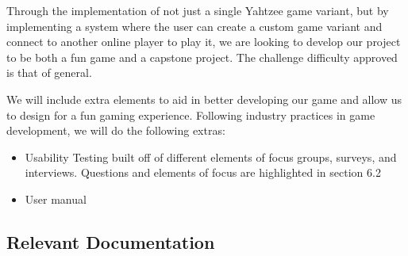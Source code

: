 \documentclass[12pt, titlepage]{article}
\begin{document}
\fi

Through the implementation of not just a single Yahtzee game variant, but by implementing a system where the user can create a custom game variant and connect to another online player to play it, we are looking to develop our project to be both a fun game and a capstone project. The challenge difficulty approved is that of general.

\iffalse
, we are looking to achieve the advanced challenge level. We would also provide some pre-set game variants that have been tested and were found to be more fun than others.
\fi

We will include extra elements to aid in better developing our game and allow us to design for a fun gaming experience. Following industry practices in game development, we will do the following extras:
\begin{itemize}
	\item Usability Testing built off of different elements of focus groups, surveys, and interviews. Questions and elements of focus are highlighted in section 6.2
	\item User manual
\end{itemize}

\subsection{Relevant Documentation}

\iffalse
\wss{Reference relevant documentation.  This will definitely include your SRS
  and your other project documents (design documents, like MG, MIS, etc).  You
  can include these even before they are written, since by the time the project
  is done, they will be written.  You can create BibTeX entries for your
  documents and within those entries include a hyperlink to the documents.}
\citet{SRS}
\wss{Don't just list the other documents.  You should explain why they are relevant and 
how they relate to your VnV efforts.}
\fi
\end{document}
